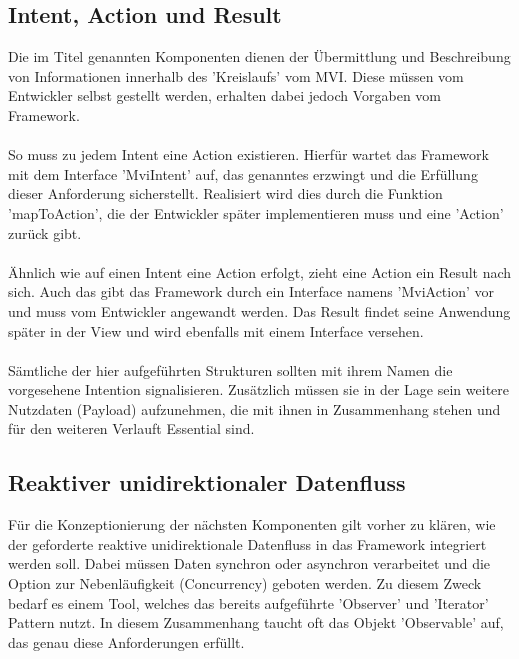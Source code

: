 \subsection{Intent, Action und Result}
\label{subsec:intent-action-und-result}
Die im Titel genannten Komponenten dienen der Übermittlung und Beschreibung von Informationen innerhalb des 'Kreislaufs' vom MVI. Diese müssen vom Entwickler selbst gestellt werden, erhalten dabei jedoch Vorgaben vom Framework.
\\\\
So muss zu jedem Intent eine Action existieren. Hierfür wartet das Framework mit dem Interface 'MviIntent' auf, das genanntes erzwingt und die Erfüllung dieser Anforderung sicherstellt. Realisiert wird dies durch die Funktion 'mapToAction', die der Entwickler später implementieren muss und eine 'Action' zurück gibt.  
\\\\
Ähnlich wie auf einen Intent eine Action erfolgt, zieht eine Action ein Result nach sich. Auch das gibt das Framework durch ein Interface namens 'MviAction' vor und muss vom Entwickler angewandt werden. Das Result findet seine Anwendung später in der View und wird ebenfalls mit einem Interface versehen.
\\
\\
Sämtliche der hier aufgeführten Strukturen sollten mit ihrem Namen die vorgesehene Intention signalisieren. Zusätzlich müssen sie in der Lage sein weitere Nutzdaten (Payload) aufzunehmen, die mit ihnen in Zusammenhang stehen und für den weiteren Verlauft Essential sind.

\subsection{Reaktiver unidirektionaler Datenfluss}
\label{subsec:reaktiver-unidirektionaler-datenfluss}
Für die Konzeptionierung der nächsten Komponenten gilt vorher zu klären, wie der geforderte reaktive unidirektionale Datenfluss in das Framework integriert werden soll. Dabei müssen Daten synchron oder asynchron verarbeitet und die Option zur Nebenläufigkeit (Concurrency) geboten werden. Zu diesem Zweck bedarf es einem Tool, welches das bereits aufgeführte 'Observer' und 'Iterator' Pattern nutzt. In diesem Zusammenhang taucht oft das Objekt 'Observable' auf, das genau diese Anforderungen erfüllt.  

